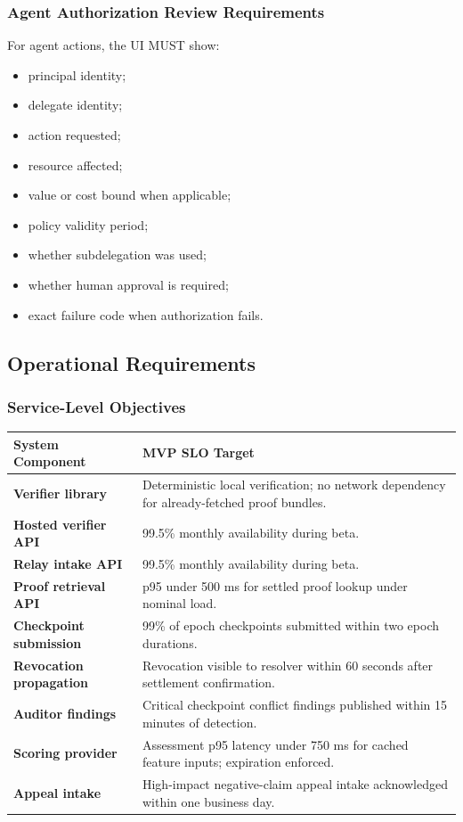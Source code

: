 \documentclass[11pt]{article}
\begin{document}
\subsubsection{Agent Authorization Review Requirements}

For agent actions, the UI MUST show:

\begin{itemize}
    \item principal identity;
    \item delegate identity;
    \item action requested;
    \item resource affected;
    \item value or cost bound when applicable;
    \item policy validity period;
    \item whether subdelegation was used;
    \item whether human approval is required;
    \item exact failure code when authorization fails.
\end{itemize}

\subsection{Operational Requirements}

\subsubsection{Service-Level Objectives}

\begin{center}
\begin{tabularx}{\textwidth}{>{\bfseries}p{} X}
\toprule
System Component & MVP SLO Target \\
\midrule
Verifier library & Deterministic local verification; no network dependency for already-fetched proof bundles. \\
Hosted verifier API & 99.5\% monthly availability during beta. \\
Relay intake API & 99.5\% monthly availability during beta. \\
Proof retrieval API & p95 under 500 ms for settled proof lookup under nominal load. \\
Checkpoint submission & 99\% of epoch checkpoints submitted within two epoch durations. \\
Revocation propagation & Revocation visible to resolver within 60 seconds after settlement confirmation. \\
Auditor findings & Critical checkpoint conflict findings published within 15 minutes of detection. \\
Scoring provider & Assessment p95 latency under 750 ms for cached feature inputs; expiration enforced. \\
Appeal intake & High-impact negative-claim appeal intake acknowledged within one business day. \\
\bottomrule
\end{tabularx}
\end{center}
\end{document}
